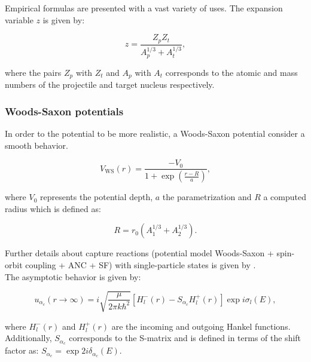 \documentclass[openany]{book}
\begin{document}
Empirical formulas are presented with a vast variety of uses. The expansion variable $z$ is given by:

\begin{equation}\label{eq:potential_empirical_z}
	z = \frac{Z_pZ_t }{A_p^{1/3} + A_t^{1/3}},
\end{equation}

where the pairs $Z_p$ with $Z_t$ and $A_p$ with $A_t$ corresponds to the atomic and mass numbers of the projectile and target nucleus respectively.

\subsubsection{Woods-Saxon potentials} \label{sub:potential_effective_woodsSaxon}

In order to the potential to be more realistic, a Woods-Saxon potential consider a smooth behavior.

\begin{equation} \label{eq:potential_WoodsSaxon}
	V_{\mathrm{WS}}(r) = \frac{-V_0}{1 + \exp  \left({\frac{r-R}{a}}\right)},
\end{equation}

where $V_0$ represents the potential depth, $a$ the parametrization and $R$ a computed radius which is defined as: 

\begin{equation} \label{eq:potential_WoodsSaxon_radius}
	R = r_0(A_1^{1/3} + A_2^{1/3}).
\end{equation}

Further details about capture reactions (potential model Woods-Saxon + spin-orbit coupling + ANC + SF) with single-particle states is given by \cite{huang_bertulani_guimaraes_2010}. \\

The asymptotic behavior is given by: 

\begin{equation}\label{eq:potential_uc}
	u_{\alpha_c}(r \rightarrow \infty) = i \sqrt{\frac{\mu}{2\pi k \hbar^2}}[H^{-}_l(r) - S_{\alpha_c}H^{+}_l(r)]\exp {i\sigma_l(E)},
\end{equation}

where $H^{-}_l(r)$ and $H^{+}_l(r)$ are the incoming and outgoing Hankel functions. Additionally, $S_{\alpha_c}$ corresponds to the S-matrix and is defined in terms of the shift factor as: $S_{\alpha_c} = \exp{2i\delta_{\alpha_c	}}(E)$. \\
	
\end{document}

